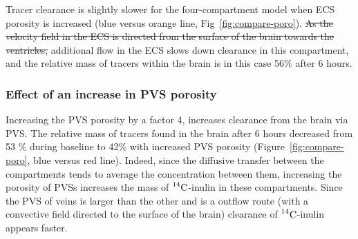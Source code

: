 \documentclass[10pt]{article}
\newcommand{\1}{^{(1)}}
\newcommand{\2}{^{(2)}}
\newcommand{\Cinulin}{$\prescript{14}{}{\text{C}}$-inulin }
\newcommand{\corr}[1]{\textcolor{blue}{#1}} %
\providecommand{\DIFaddtex}[1]{{\protect\color{blue}\uwave{#1}}} %
\providecommand{\DIFdeltex}[1]{{\protect\color{red}\sout{#1}}}                      %
\providecommand{\DIFaddbegin}{} %
\providecommand{\DIFaddend}{} %
\providecommand{\DIFdelbegin}{} %
\providecommand{\DIFdelend}{} %
\providecommand{\DIFadd}[1]{\texorpdfstring{\DIFaddtex{#1}}{#1}} %
\providecommand{\DIFdel}[1]{\texorpdfstring{\DIFdeltex{#1}}{}} %
\newcommand{\DIFscaledelfig}{0.5}
\newlength{\DIFdelgraphicswidth} %
\newlength{\DIFdelgraphicsheight} %
\newcommand{\DIFaddincludegraphics}[2][]{{\color{blue}\fbox{\DIFOincludegraphics[#1]{#2}}}} %
\newcommand{\DIFdelincludegraphics}[2][]{%
\sbox{\DIFdelgraphicsbox}{\DIFOincludegraphics[#1]{#2}}%
\settoboxwidth{\DIFdelgraphicswidth}{\DIFdelgraphicsbox} %
\settoboxtotalheight{\DIFdelgraphicsheight}{\DIFdelgraphicsbox} %
\scalebox{\DIFscaledelfig}{%
\parbox[b]{\DIFdelgraphicswidth}{\usebox{\DIFdelgraphicsbox}\\[-\baselineskip] \rule{\DIFdelgraphicswidth}{0em}}\llap{\resizebox{\DIFdelgraphicswidth}{\DIFdelgraphicsheight}{%
\setlength{\unitlength}{\DIFdelgraphicswidth}%
\begin{picture}(1,1)%
\thicklines\linethickness{2pt} %
{\color[rgb]{1,0,0}\put(0,0){\framebox(1,1){}}}%
{\color[rgb]{1,0,0}\put(0,0){\line( 1,1){1}}}%
{\color[rgb]{1,0,0}\put(0,1){\line(1,-1){1}}}%
\end{picture}%
}\hspace*{3pt}}} %
} %
\DeclareRobustCommand{\DIFaddbegin}{\DIFOaddbegin \let\includegraphics\DIFaddincludegraphics} %
\DeclareRobustCommand{\DIFaddend}{\DIFOaddend \let\includegraphics\DIFOincludegraphics} %
\DeclareRobustCommand{\DIFdelbegin}{\DIFOdelbegin \let\includegraphics\DIFdelincludegraphics} %
\DeclareRobustCommand{\DIFdelend}{\DIFOaddend \let\includegraphics\DIFOincludegraphics} %
\begin{document}
Tracer clearance is slightly slower for the four-compartment model when ECS porosity is increased (blue versus orange line, Fig~\ref{fig:compare-poro}). \DIFdelbegin \DIFdel{As the velocity field in the ECS is directed from the surface of the brain towards the ventricles,
}\DIFdelend \DIFaddbegin \DIFadd{\corr{Since the velocity field in the ECS  is directed inwards from the brain surface, solutes are transported away from the sinks at the domain boundaries.} Hence,
}\DIFaddend additional flow in the ECS slows down clearance in this compartment, and the relative mass of tracers within the brain is in this case 56\% after 6 hours. 

\subsubsection{Effect of an increase in PVS porosity}

Increasing the PVS porosity by a factor 4, increases clearance from the brain via PVS. The relative mass of tracers found in the brain after 6 hours decreased from 53 \% during baseline to 42\% with increased PVS porosity (Figure~\ref{fig:compare-poro}, blue versus red line). Indeed, since the diffusive transfer between the compartments tends to average the concentration between them, increasing the porosity of PVSs increases the mass of \Cinulin in these compartments. Since the PVS of veins is larger than the other and is a outflow route (with a convective field directed to the surface of the brain) clearance of \Cinulin appears faster.


\end{document}
